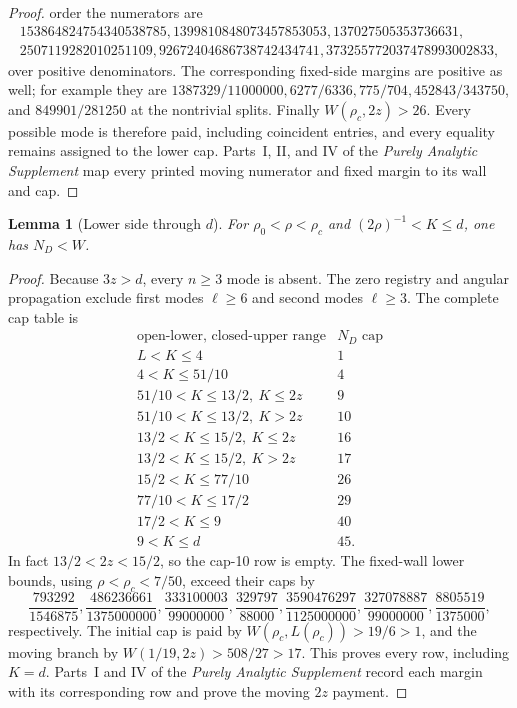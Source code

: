 \documentclass[11pt]{article}
\numberwithin{equation}{section}
\newtheorem{lemma}[theorem]{Lemma}
\theoremstyle{definition}
\theoremstyle{remark}
\begin{document}
\begin{proof}
order the numerators are
\[
\begin{gathered}
153864824754340538785,
1399810848073457853053,
137027505353736631,\\
2507119282010251109,
92672404686738742434741,
373255772037478993002833,
\end{gathered}
\]
over positive denominators.  The corresponding fixed-side margins are
positive as well; for example they are
\(1387329/11000000,6277/6336,775/704,452843/343750\), and
\(849901/281250\) at the nontrivial splits.  Finally
\(W(\rho_c,2z)>26\).  Every possible mode is therefore paid, including
coincident entries, and every equality remains assigned to the lower cap.
 Parts~I, II, and IV of the \emph{Purely Analytic Supplement} map every
 printed moving numerator and fixed margin to its wall and cap.
\end{proof}

\begin{lemma}[Lower side through \(d\)]
\label{cm:lem-lower-d}
For \(\rho_0<\rho<\rho_c\) and
\((2\rho)^{-1}<K\leq d\), one has \(N_D<W\).
\end{lemma}

\begin{proof}
Because \(3z>d\), every \(n\geq3\) mode is absent.  The zero registry and
angular propagation exclude first modes \(\ell\geq6\) and second modes
\(\ell\geq3\).  The complete cap table is
\[
\begin{array}{c|c}
\text{open-lower, closed-upper range}&N_D\text{ cap}\\ \hline
L<K\leq4&1\\
4<K\leq51/10&4\\
51/10<K\leq13/2,\ K\leq2z&9\\
51/10<K\leq13/2,\ K>2z&10\\
13/2<K\leq15/2,\ K\leq2z&16\\
13/2<K\leq15/2,\ K>2z&17\\
15/2<K\leq77/10&26\\
77/10<K\leq17/2&29\\
17/2<K\leq9&40\\
9<K\leq d&45.
\end{array}
\]
In fact \(13/2<2z<15/2\), so the cap-10 row is empty.  The fixed-wall
lower bounds, using \(\rho<\rho_c<7/50\), exceed their caps by
\[
 \frac{793292}{1546875},\frac{486236661}{1375000000},
 \frac{333100003}{99000000},\frac{329797}{88000},
 \frac{3590476297}{1125000000},\frac{327078887}{99000000},
 \frac{8805519}{1375000},
\]
respectively.  The initial cap is paid by
\(W(\rho_c,L(\rho_c))>19/6>1\), and the moving branch by
\(W(1/19,2z)>508/27>17\).  This proves every row, including \(K=d\).
 Parts~I and IV of the \emph{Purely Analytic Supplement} record each margin
 with its corresponding row and prove the moving \(2z\) payment.
\end{proof}
\end{document}
